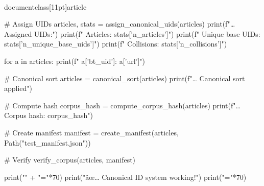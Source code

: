 \\documentclass[11pt]{article}
\begin{document}
\begin{CodeBlock}
    # Assign UIDs
    articles, stats = assign_canonical_uids(articles)
    print(f"… Assigned UIDs:")
    print(f"   Articles: {stats['n_articles']}")
    print(f"   Unique base UIDs: {stats['n_unique_base_uids']}")
    print(f"   Collisions: {stats['n_collisions']}")
    
    for a in articles:
        print(f"   {a['bt_uid']}: {a['url']}")
    
    # Canonical sort
    articles = canonical_sort(articles)
    print(f"… Canonical sort applied")
    
    # Compute hash
    corpus_hash = compute_corpus_hash(articles)
    print(f"… Corpus hash: {corpus_hash}")
    
    # Create manifest
    manifest = create_manifest(articles, Path("test_manifest.json"))
    
    # Verify
    verify_corpus(articles, manifest)
    
    print("\n" + "="*70)
    print("âœ… Canonical ID system working!")
    print("="*70)
\end{CodeBlock}
\end{document}
